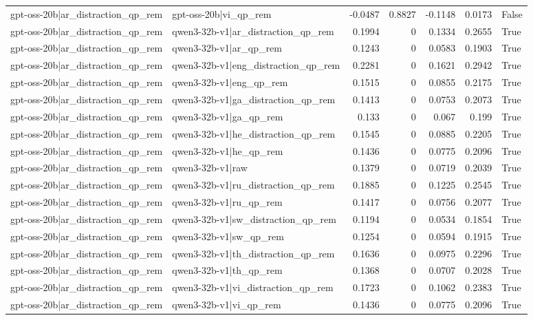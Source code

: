 \begin{table}
\begin{tabular}{l l r r r r l}
gpt-oss-20b|ar_distraction_qp_rem & gpt-oss-20b|vi_qp_rem & -0.0487 & 0.8827 & -0.1148 & 0.0173 & False \\
gpt-oss-20b|ar_distraction_qp_rem & qwen3-32b-v1|ar_distraction_qp_rem & 0.1994 & 0 & 0.1334 & 0.2655 & True \\
gpt-oss-20b|ar_distraction_qp_rem & qwen3-32b-v1|ar_qp_rem & 0.1243 & 0 & 0.0583 & 0.1903 & True \\
gpt-oss-20b|ar_distraction_qp_rem & qwen3-32b-v1|eng_distraction_qp_rem & 0.2281 & 0 & 0.1621 & 0.2942 & True \\
gpt-oss-20b|ar_distraction_qp_rem & qwen3-32b-v1|eng_qp_rem & 0.1515 & 0 & 0.0855 & 0.2175 & True \\
gpt-oss-20b|ar_distraction_qp_rem & qwen3-32b-v1|ga_distraction_qp_rem & 0.1413 & 0 & 0.0753 & 0.2073 & True \\
gpt-oss-20b|ar_distraction_qp_rem & qwen3-32b-v1|ga_qp_rem & 0.133 & 0 & 0.067 & 0.199 & True \\
gpt-oss-20b|ar_distraction_qp_rem & qwen3-32b-v1|he_distraction_qp_rem & 0.1545 & 0 & 0.0885 & 0.2205 & True \\
gpt-oss-20b|ar_distraction_qp_rem & qwen3-32b-v1|he_qp_rem & 0.1436 & 0 & 0.0775 & 0.2096 & True \\
gpt-oss-20b|ar_distraction_qp_rem & qwen3-32b-v1|raw & 0.1379 & 0 & 0.0719 & 0.2039 & True \\
gpt-oss-20b|ar_distraction_qp_rem & qwen3-32b-v1|ru_distraction_qp_rem & 0.1885 & 0 & 0.1225 & 0.2545 & True \\
gpt-oss-20b|ar_distraction_qp_rem & qwen3-32b-v1|ru_qp_rem & 0.1417 & 0 & 0.0756 & 0.2077 & True \\
gpt-oss-20b|ar_distraction_qp_rem & qwen3-32b-v1|sw_distraction_qp_rem & 0.1194 & 0 & 0.0534 & 0.1854 & True \\
gpt-oss-20b|ar_distraction_qp_rem & qwen3-32b-v1|sw_qp_rem & 0.1254 & 0 & 0.0594 & 0.1915 & True \\
gpt-oss-20b|ar_distraction_qp_rem & qwen3-32b-v1|th_distraction_qp_rem & 0.1636 & 0 & 0.0975 & 0.2296 & True \\
gpt-oss-20b|ar_distraction_qp_rem & qwen3-32b-v1|th_qp_rem & 0.1368 & 0 & 0.0707 & 0.2028 & True \\
gpt-oss-20b|ar_distraction_qp_rem & qwen3-32b-v1|vi_distraction_qp_rem & 0.1723 & 0 & 0.1062 & 0.2383 & True \\
gpt-oss-20b|ar_distraction_qp_rem & qwen3-32b-v1|vi_qp_rem & 0.1436 & 0 & 0.0775 & 0.2096 & True \\

\end{tabular}
\end{table}
